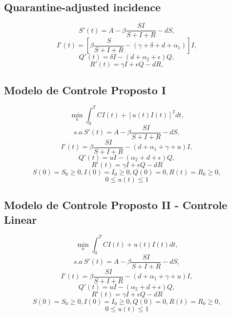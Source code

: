 \subsection{Quarantine-adjusted incidence}

$$ S'(t) = A - \beta \frac{SI}{S + I + R} - dS,$$
$$ I'(t) = [\beta \frac{S}{S + I + R}  - (\gamma + \delta + d + \alpha_1)]I,$$
$$ Q'(t) = \delta I - (d + \alpha_2 + \epsilon)Q,$$
$$ R'(t) = \gamma I + \epsilon Q - dR, $$

\subsection{Modelo de Controle Proposto I}

$$\min_{u} \int_0^T CI(t) + [u(t)I(t)]^2 dt, $$
$$ s.a~ S'(t) = A - \beta\frac{SI}{S + I + R} - dS, $$
$$ I'(t) = \beta\frac{SI}{S + I + R} - (d + \alpha_1 + \gamma + u)I,  $$
$$ Q'(t) = uI - (\alpha_2 + d + \epsilon)Q,$$
$$ R'(t) = \gamma I + \epsilon Q - dR $$
$$ S(0) = S_0 \geq 0, I(0) = I_0  \geq 0, Q(0) = 0, R(t) = R_0 \geq 0,$$
$$ 0 \leq u(t) \leq 1 $$ 

\subsection{Modelo de Controle Proposto II - Controle Linear}

$$\min_{u} \int_0^T CI(t) + u(t)I(t) dt, $$
$$ s.a~ S'(t) = A - \beta\frac{SI}{S + I + R} - dS, $$
$$ I'(t) = \beta\frac{SI}{S + I + R} - (d + \alpha_1 + \gamma + u)I,  $$
$$ Q'(t) = uI - (\alpha_2 + d + \epsilon)Q,$$
$$ R'(t) = \gamma I + \epsilon Q - dR $$
$$ S(0) = S_0 \geq 0, I(0) = I_0  \geq 0, Q(0) = 0, R(t) = R_0 \geq 0,$$
$$ 0 \leq u(t) \leq 1 $$ 
